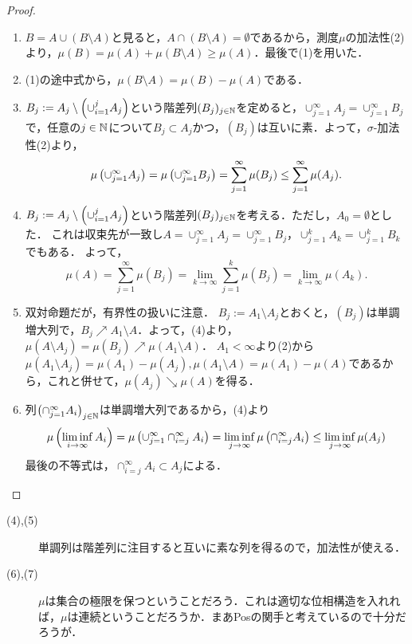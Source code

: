 \documentclass[uplatex, dvipdfmx]{jsreport}
\begin{document}
\begin{proof}\mbox{}
    \begin{enumerate}
        \item $B=A\cup(B\setminus A)$と見ると，$A\cap(B\setminus A)=\emptyset$であるから，測度$\mu$の加法性(2)より，$\mu(B)=\mu(A)+\mu(B\setminus A)\ge\mu(A)$．最後で(1)を用いた．
        \item (1)の途中式から，$\mu(B\setminus A)=\mu(B)-\mu(A)$である．
        \item $B_j:=A_j\setminus\left(\cup_{i=1}^jA_j\right)$という階差列$(B_j)_{j\in\mathbb{N}}$を定めると，$\cup_{j=1}^\infty A_j=\cup_{j=1}^\infty B_j$で，任意の$j\in\mathbb{N}$について$B_j\subset A_j$かつ，$(B_j)$は互いに素．よって，$\sigma$-加法性(2)より，
        \[\mu\left(\cup_{j=1}^\infty A_j\right)=\mu\left(\cup_{j=1}^\infty B_j\right)=\sum^\infty_{j=1}\mu(B_j)\le\sum^\infty_{j=1}\mu(A_j).\]
        \item $B_j:=A_j\setminus\left(\cup_{i=1}^jA_j\right)$という階差列$(B_j)_{j\in\mathbb{N}}$を考える．ただし，$A_0=\emptyset$とした．
        これは収束先が一致し$A=\cup_{j=1}^\infty A_j=\cup_{j=1}^\infty B_j$，$\cup_{j=1}^kA_k=\cup_{j=1}^kB_k$でもある．
        よって，
        \[\mu(A)=\sum^\infty_{j=1}\mu(B_j)=\lim_{k\to\infty}\sum_{j=1}^k\mu(B_j)=\lim_{k\to\infty}\mu(A_k).\]
        \item 双対命題だが，有界性の扱いに注意．
        $B_j:=A_1\setminus A_j$とおくと，$(B_j)$は単調増大列で，$B_j\nearrow A_1\setminus A$．よって，(4)より，$\mu(A\setminus A_j)=\mu(B_j)\nearrow\mu(A_1\setminus A)$．
        $A_1<\infty$より(2)から$\mu(A_1\setminus A_j)=\mu(A_1)-\mu(A_j),\mu(A_1\setminus A)=\mu(A_1)-\mu(A)$であるから，これと併せて，$\mu(A_j)\searrow\mu(A)$を得る．
        \item 列$\left(\cap^\infty_{j=1}A_i\right)_{j\in\mathbb{N}}$は単調増大列であるから，(4)より
        \[\mu\left(\liminf_{i\to\infty}A_i\right)=\mu\left(\cup^\infty_{j=1}\cap^\infty_{i=j}A_i\right)=\liminf_{j\to\infty}\mu\left(\cap^\infty_{i=j}A_i\right)\le\liminf_{j\to\infty}\mu(A_j)\]
        最後の不等式は，$\cap^\infty_{i=j}A_i\subset A_j$による．
    \end{enumerate}
\end{proof}
\begin{remarks}\mbox{}
    \begin{description}
        \item[(4),(5)] 単調列は階差列に注目すると互いに素な列を得るので，加法性が使える．
        \item[(6),(7)] $\mu$は集合の極限を保つということだろう．これは適切な位相構造を入れれば，$\mu$は連続ということだろうか．まあPosの関手と考えているので十分だろうが．
    \end{description}
\end{remarks}
\end{document}
